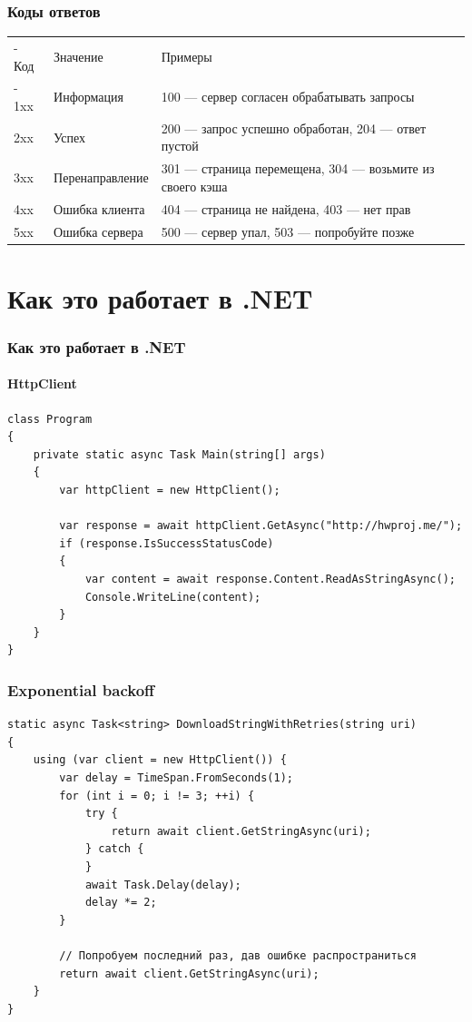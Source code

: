 \documentclass[xetex,mathserif,serif]{beamer}
\begin{document}
	\begin{frame}
		\frametitle{Коды ответов}
		\begin{small}
			\begin{tabu} {| X[0.3 l p] | X[0.5 l p] | X[1 l p] |}
				\tabucline-
				Код  & Значение         & Примеры                                                       \\
				\tabucline-
				\everyrow{\tabucline-}
				1xx  & Информация       & 100 --- сервер согласен обрабатывать запросы                  \\
				2xx  & Успех            & 200 --- запрос успешно обработан, 204 --- ответ пустой        \\
				3xx  & Перенаправление  & 301 --- страница перемещена, 304 --- возьмите из своего кэша  \\
				4xx  & Ошибка клиента   & 404 --- страница не найдена, 403 --- нет прав                 \\
				5xx  & Ошибка сервера   & 500 --- сервер упал, 503 --- попробуйте позже                 \\
			\end{tabu}
		\end{small}
	\end{frame}

	\section{Как это работает в .NET}

	\begin{frame}[fragile]
		\frametitle{Как это работает в .NET}
		\framesubtitle{HttpClient}
		\begin{verbatim}
class Program
{
    private static async Task Main(string[] args)
    {
        var httpClient = new HttpClient();

        var response = await httpClient.GetAsync("http://hwproj.me/");
        if (response.IsSuccessStatusCode)
        {
            var content = await response.Content.ReadAsStringAsync();
            Console.WriteLine(content);
        }
    }
}
		\end{verbatim}
	\end{frame}

	\begin{frame}[fragile]
		\frametitle{Exponential backoff}
		\begin{footnotesize}
			\begin{verbatim}
static async Task<string> DownloadStringWithRetries(string uri)
{
    using (var client = new HttpClient()) {
        var delay = TimeSpan.FromSeconds(1);
        for (int i = 0; i != 3; ++i) {
            try {
                return await client.GetStringAsync(uri);
            } catch {
            }
            await Task.Delay(delay);
            delay *= 2;
        }

        // Попробуем последний раз, дав ошибке распространиться
        return await client.GetStringAsync(uri);
    }
}
			\end{verbatim}
		\end{footnotesize}
	\end{frame}
\end{document}
